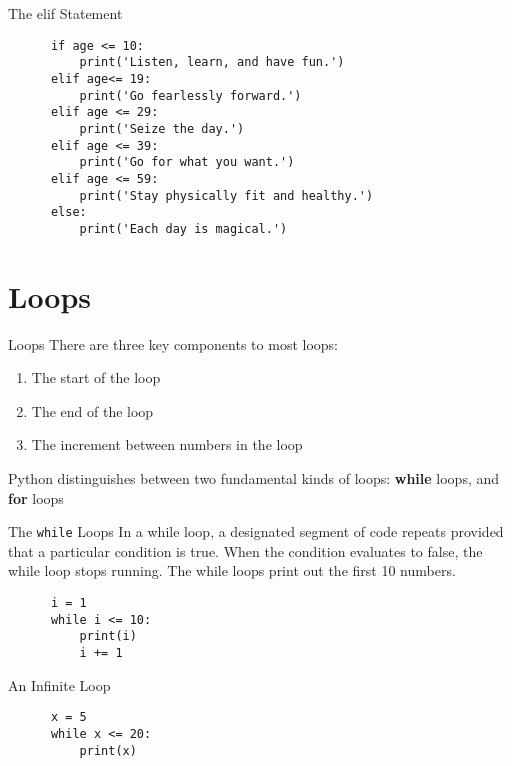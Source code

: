 \documentclass[../main.tex]{subfiles}
\begin{document}
\begin{frame}[fragile]{The elif Statement}
  \begin{code}{}
    \begin{lstlisting}
      if age <= 10:
          print('Listen, learn, and have fun.')
      elif age<= 19:
          print('Go fearlessly forward.')
      elif age <= 29:
          print('Seize the day.')
      elif age <= 39:
          print('Go for what you want.')
      elif age <= 59:
          print('Stay physically fit and healthy.')
      else:
          print('Each day is magical.')
    \end{lstlisting}
  \end{code}
\end{frame}

\section{Loops}
\label{sec:loops}


\begin{frame}{Loops}
  There are three key components to most loops:
  
  \begin{enumerate} \justifying
  \item The start of the loop
  \item The end of the loop
  \item The increment between numbers in the loop
  \end{enumerate}
  
Python distinguishes between two fundamental kinds of loops: \textbf{while} loops, and \textbf{for} loops
\end{frame}

\begin{frame}[fragile]{The \texttt{while} Loops}
  In a while loop, a designated segment of code repeats provided that a particular condition is true. When the condition evaluates to false, the while loop stops running. The while loops print out the first 10 numbers.

  \begin{code}{}
    \begin{lstlisting}
      i = 1
      while i <= 10:
          print(i)
          i += 1
    \end{lstlisting}
  \end{code}

  \begin{code}{An Infinite Loop}
    \begin{lstlisting}
      x = 5
      while x <= 20:
          print(x)
    \end{lstlisting}
  \end{code}
\end{frame}
\end{document}
